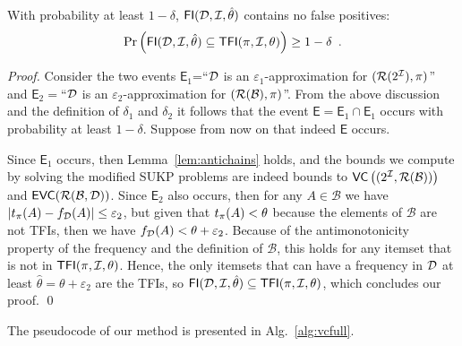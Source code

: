 \begin{theorem}\label{lem:vcfull}
With probability at least $1-\delta$, %
$\mathsf{FI}({\cal D},{\cal I},\hat\theta)$ contains no false positives:
\[
\Pr\left(\mathsf{FI}({\cal D},{\cal I},\hat\theta)\subseteq\mathsf{TFI}(\pi,{\cal I},\theta)\right)\ge 1-\delta\enspace.\]
\end{theorem}
\begin{proof}
  Consider the two events $\mathsf{E}_1$=``${\cal D}$ is an
  $\varepsilon_1$-approximation for $(\mathcal{R}(2^{\cal I}),\pi)$'' and
  $\mathsf{E}_2=$``${\cal D}$ is an
  $\varepsilon_2$-approximation for $(\mathcal{R}(\mathcal{B}),\pi)$''. From
  the above discussion and the definition of $\delta_1$ and $\delta_2$ it
  follows that the event $\mathsf{E}=\mathsf{E}_1\cap\mathsf{E}_1$ occurs with
  probability at least $1-\delta$. Suppose from now on that indeed $\mathsf{E}$
  occurs.

  Since $\mathsf{E}_1$ occurs, then Lemma~\ref{lem:antichains}
  holds, and the bounds we compute by solving the modified SUKP problems are
  indeed bounds to $\mathsf{VC}\left((2^{\cal I},\mathcal{R}(\mathcal{B}))\right)$ and
  $\mathsf{EVC}(\mathcal{R}(\mathcal{B},{\cal D}))$. %
  Since $\mathsf{E}_2$ also occurs, then for any $A\in\mathcal{B}$ we
  have $|t_\pi(A)-f_{\cal D}(A)|\le\varepsilon_2$, but given that $t_\pi(A)<\theta$
  because the elements of $\mathcal{B}$ are not TFIs, then we have
  $f_{\cal D}(A)<\theta+\varepsilon_2$. Because of the antimonotonicity property
  of the frequency and the definition of $\mathcal{B}$, this holds for any
  itemset that is not in $\mathsf{TFI}(\pi,{\cal I},\theta)$. Hence, the only itemsets that can have a
  frequency in ${\cal D}$ at least $\hat{\theta}=\theta+\varepsilon_2$ are the TFIs, so
  $\mathsf{FI}({\cal D},{\cal I},\hat{\theta})\subseteq\mathsf{TFI}(\pi,{\cal I},\theta)$, which concludes
  our proof.
  \qed
\end{proof}

The pseudocode of our method is presented in Alg.~\ref{alg:vcfull}.

